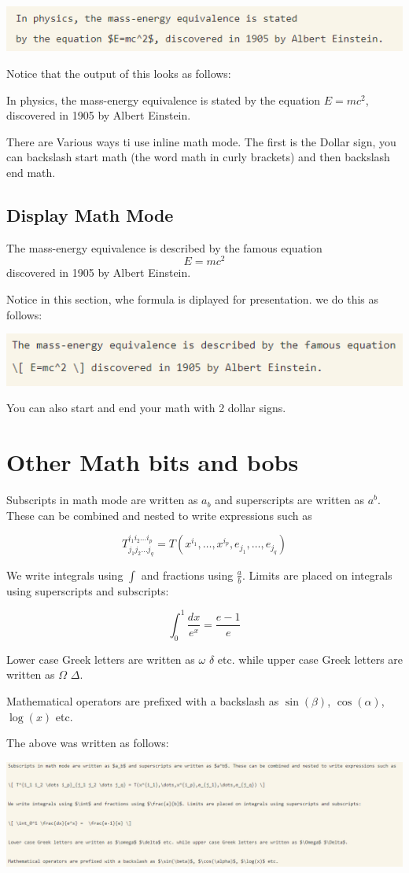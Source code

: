 \documentclass[12pt,a4paper]{article}
\begin{document}
\includegraphics{Inline Math Example.PNG}

Notice that the output of this looks as follows:

In physics, the mass-energy equivalence is stated 
by the equation $E=mc^2$, discovered in 1905 by Albert Einstein.

There are Various ways ti use inline math mode. The first is the Dollar sign, you can backslash start math (the word math in curly brackets) and then backslash end math. 
\subsection{Display Math Mode}

The mass-energy equivalence is described by the famous equation
\[ E=mc^2 \] discovered in 1905 by Albert Einstein. 

Notice in this section, whe formula is diplayed for presentation. we do this as follows:

\includegraphics{Display Math Mode Example.PNG}

You can also start and end your math with 2 dollar signs. 

\section{Other Math bits and bobs}
Subscripts in math mode are written as $a_b$ and superscripts are written as $a^b$. These can be combined and nested to write expressions such as

\[ T^{i_1 i_2 \dots i_p}_{j_1 j_2 \dots j_q} = T(x^{i_1},\dots,x^{i_p},e_{j_1},\dots,e_{j_q}) \]
 
We write integrals using $\int$ and fractions using $\frac{a}{b}$. Limits are placed on integrals using superscripts and subscripts:

\[ \int_0^1 \frac{dx}{e^x} =  \frac{e-1}{e} \]

Lower case Greek letters are written as $\omega$ $\delta$ etc. while upper case Greek letters are written as $\Omega$ $\Delta$.

Mathematical operators are prefixed with a backslash as $\sin(\beta)$, $\cos(\alpha)$, $\log(x)$ etc.

The above was written as follows:

\includegraphics{Math Example Bits and Bobs.PNG}
\end{document}
